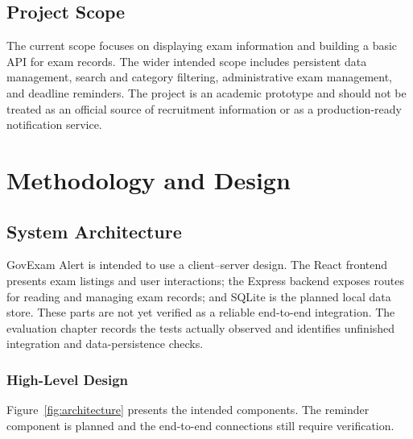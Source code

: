\documentclass[12pt,a4paper]{report}
\begin{document}
\section{Project Scope}
The current scope focuses on displaying exam information and building a basic API for exam records. The wider intended scope includes persistent data management, search and category filtering, administrative exam management, and deadline reminders. The project is an academic prototype and should not be treated as an official source of recruitment information or as a production-ready notification service.

\chapter{Methodology and Design}

\section{System Architecture}
GovExam Alert is intended to use a client--server design. The React frontend presents exam listings and user interactions; the Express backend exposes routes for reading and managing exam records; and SQLite is the planned local data store. These parts are not yet verified as a reliable end-to-end integration. The evaluation chapter records the tests actually observed and identifies unfinished integration and data-persistence checks.

\subsection{High-Level Design}
Figure~\ref{fig:architecture} presents the intended components. The reminder component is planned and the end-to-end connections still require verification.
\end{document}
